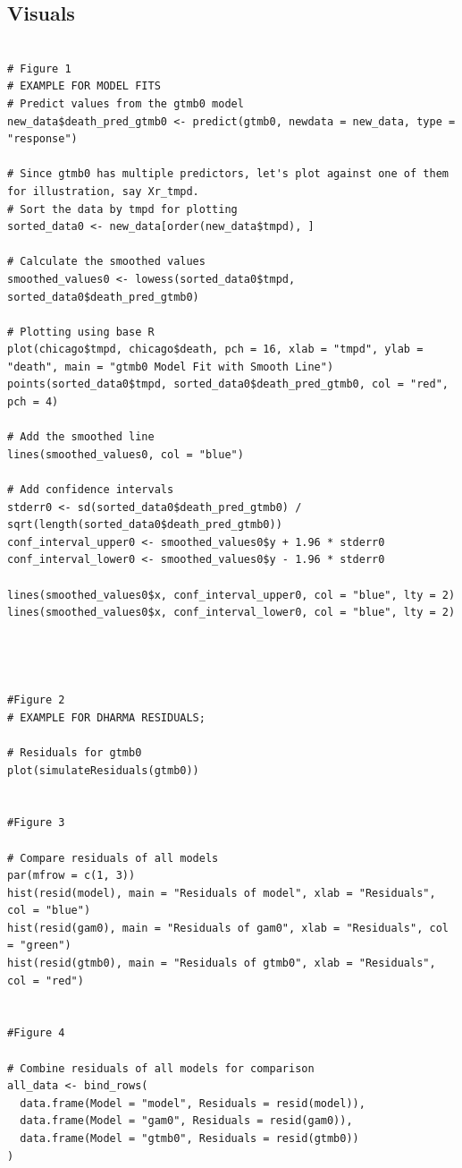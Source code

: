 \subsection{Visuals}
\begin{verbatim}

# Figure 1
# EXAMPLE FOR MODEL FITS
# Predict values from the gtmb0 model
new_data$death_pred_gtmb0 <- predict(gtmb0, newdata = new_data, type = "response")

# Since gtmb0 has multiple predictors, let's plot against one of them for illustration, say Xr_tmpd.
# Sort the data by tmpd for plotting
sorted_data0 <- new_data[order(new_data$tmpd), ]

# Calculate the smoothed values
smoothed_values0 <- lowess(sorted_data0$tmpd, sorted_data0$death_pred_gtmb0)

# Plotting using base R
plot(chicago$tmpd, chicago$death, pch = 16, xlab = "tmpd", ylab = "death", main = "gtmb0 Model Fit with Smooth Line")
points(sorted_data0$tmpd, sorted_data0$death_pred_gtmb0, col = "red", pch = 4)

# Add the smoothed line
lines(smoothed_values0, col = "blue")

# Add confidence intervals
stderr0 <- sd(sorted_data0$death_pred_gtmb0) / sqrt(length(sorted_data0$death_pred_gtmb0))
conf_interval_upper0 <- smoothed_values0$y + 1.96 * stderr0
conf_interval_lower0 <- smoothed_values0$y - 1.96 * stderr0

lines(smoothed_values0$x, conf_interval_upper0, col = "blue", lty = 2)
lines(smoothed_values0$x, conf_interval_lower0, col = "blue", lty = 2)




#Figure 2
# EXAMPLE FOR DHARMA RESIDUALS;

# Residuals for gtmb0
plot(simulateResiduals(gtmb0))


#Figure 3

# Compare residuals of all models
par(mfrow = c(1, 3))
hist(resid(model), main = "Residuals of model", xlab = "Residuals", col = "blue")
hist(resid(gam0), main = "Residuals of gam0", xlab = "Residuals", col = "green")
hist(resid(gtmb0), main = "Residuals of gtmb0", xlab = "Residuals", col = "red")


#Figure 4

# Combine residuals of all models for comparison
all_data <- bind_rows(
  data.frame(Model = "model", Residuals = resid(model)),
  data.frame(Model = "gam0", Residuals = resid(gam0)),
  data.frame(Model = "gtmb0", Residuals = resid(gtmb0))
)


\end{verbatim}
